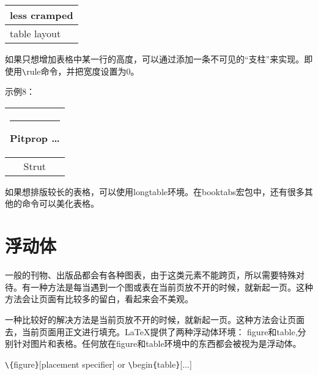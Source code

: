 \documentclass[UTF8]{ctexart}
\begin{document}
{\renewcommand{\arraystretch}{1.5}
\renewcommand{\tabcolsep}{0.2cm}
\begin{tabular}{|l|}
\hline
less cramped\\\hline
table layout\\\hline
\end{tabular}}
\newline

如果只想增加表格中某一行的高度，可以通过添加一条不可见的“支柱”来实现。即使用\texttt{\textbackslash}rule命令，并把宽度设置为0。
\newline

示例8：
\newline

\begin{tabular}{|c|}
\hline
\rule{1pt}{4ex}Pitprop \ldots\\
\hline
\rule{0pt}{4ex}Strut\\
\hline
\end{tabular}
\newline

如果想排版较长的表格，可以使用longtable环境。在booktabs宏包中，还有很多其他的命令可以美化表格。
\section{浮动体}
\qquad 一般的刊物、出版品都会有各种图表，由于这类元素不能跨页，所以需要特殊对待。有一种方法是每当遇到一个图或表在当前页放不开的时候，就新起一页。这种方法会让页面有比较多的留白，看起来会不美观。

\qquad 一种比较好的解决方法是当前页放不开的时候，就新起一页。这种方法会让页面去，当前页面用正文进行填充。\LaTeX 提供了两种浮动体环境：
figure和table,分别针对图片和表格。任何放在figure和table环境中的东西都会被视为是浮动体。

\texttt{\textbackslash}\texttt{\{}figure\texttt{\}}[placement specifier] or \texttt{\textbackslash}begin\texttt{\{}table\texttt{\}}[...]
\end{document}
